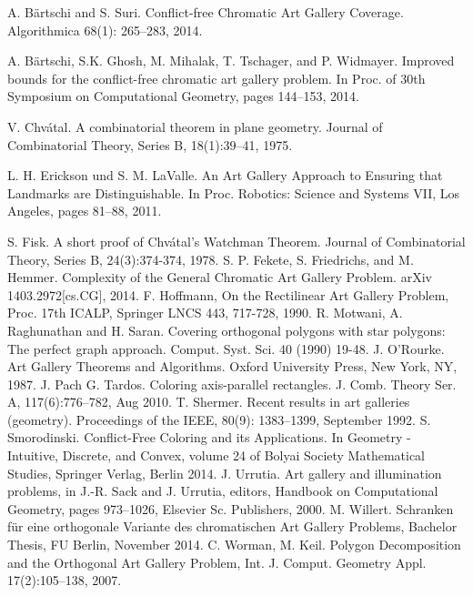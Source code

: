 \documentclass[a4paper,USenglish,numberwithinsect]{lipics}
\theoremstyle{plain}
\begin{document}


\begin{thebibliography}{999}


 A. B\"artschi and S. Suri. Conflict-free Chromatic Art Gallery Coverage. Algorithmica 68(1): 265--283, 2014.

 A. B\"artschi, S.K. Ghosh, M. Mihalak, T. Tschager, and P. Widmayer. 
Improved bounds for the conflict-free chromatic art gallery problem. In Proc. of 30th Symposium on Computational Geometry, pages 144--153, 2014.

 V. Chv\'atal. A combinatorial theorem in plane geometry. Journal of Combinatorial Theory, Series B, 18(1):39--41, 1975.

 L. H. Erickson und S. M. LaValle. An Art Gallery Approach to Ensuring that Landmarks are Distinguishable. In Proc. Robotics: Science and Systems VII, Los Angeles, pages 81--88, 2011.



 S. Fisk. A short proof of Chv\'atal's Watchman Theorem. Journal of Combinatorial Theory, Series B, 24(3):374-374, 1978.
 S. P. Fekete, S. Friedrichs, and M. Hemmer. Complexity of the General Chromatic Art Gallery Problem. arXiv 1403.2972[cs.CG], 2014.
F. Hoffmann, On the Rectilinear Art Gallery Problem, Proc. 17th ICALP, Springer LNCS 443,  717-728, 1990. 
 R. Motwani, A. Raghunathan and H. Saran. Covering orthogonal polygons with star polygons: The perfect graph approach. Comput. Syst. Sci. 40 (1990) 19-48.
 J. O'Rourke. Art Gallery Theorems and Algorithms. Oxford University Press, New York, NY, 1987.
 J. Pach G. Tardos. Coloring axis-parallel rectangles. J. Comb. Theory Ser. A, 117(6):776--782, Aug 2010.
 T. Shermer. Recent results in art galleries (geometry). Proceedings of the IEEE, 80(9): 1383--1399, September 1992.
 S. Smorodinski. Conflict-Free Coloring and its Applications. In Geometry - Intuitive, Discrete, and Convex, volume 24 of Bolyai Society Mathematical Studies, Springer Verlag, Berlin 2014.
 J. Urrutia. Art gallery and illumination problems, in J.-R. Sack and J. Urrutia, editors, Handbook on Computational Geometry, pages 973--1026, Elsevier Sc. Publishers, 2000.
 M. Willert. Schranken für eine orthogonale Variante des chromatischen Art Gallery Problems, Bachelor Thesis, FU Berlin, November 2014.
 C. Worman, M. Keil. Polygon Decomposition and the Orthogonal Art Gallery Problem, Int. J. Comput. Geometry Appl. 17(2):105--138, 2007.
\end{thebibliography}
\end{document}
